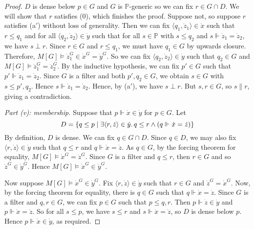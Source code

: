 \begin{proof}
    \( D \) is dense below \( p \in G \) and \( G \) is \( \mathbb P \)-generic so we can fix \( r \in G \cap D \).
    We will show that \( r \) satisfies (0), which finishes the proof.
    Suppose not, so suppose \( r \) satisfies (a\( ' \)) without loss of generality.
    Then we can fix \( \langle q_1, \dot z_1 \rangle \in \dot x \) such that \( r \leq q_1 \) and for all \( \langle q_2, \dot z_2 \rangle \in \dot y \) such that for all \( s \in \mathbb P \) with \( s \leq q_2 \) and \( s \Vdash \dot z_1 = \dot z_2 \), we have \( s \perp r \).
    Since \( r \in G \) and \( r \leq q_1 \), we must have \( q_1 \in G \) by upwards closure.
    Therefore, \( M[G] \vDash \dot z_1^G \in \dot x^G = \dot y^G \).
    So we can fix \( \langle q_2, \dot z_2 \rangle \in \dot y \) such that \( q_2 \in G \) and \( M[G] \vDash \dot z_1^G = \dot z_2^G \).
    By the inductive hypothesis, we can fix \( p' \in G \) such that \( p' \Vdash \dot z_1 = \dot z_2 \).
    Since \( G \) is a filter and both \( p', q_2 \in G \), we obtain \( s \in G \) with \( s \leq p', q_2 \).
    Hence \( s \Vdash \dot z_1 = \dot z_2 \).
    Hence, by (a\( ' \)), we have \( s \perp r \).
    But \( s, r \in G \), so \( s \mathrel\| r \), giving a contradiction.

    \emph{Part (v): membership.}
    Suppose that \( p \Vdash \dot x \in \dot y \) for \( p \in G \).
    Let
    \[ D = \qty{q \leq p \mid \exists \langle r, \dot z \rangle \in \dot y.\, q \leq r \wedge (q \Vdash \dot x = \dot z)} \]
    By definition, \( D \) is dense.
    We can fix \( q \in G \cap D \).
    Since \( q \in D \), we may also fix \( \langle r, \dot z \rangle \in \dot y \) such that \( q \leq r \) and \( q \Vdash \dot x = \dot z \).
    As \( q \in G \), by the forcing theorem for equality, \( M[G] \vDash \dot x^G = \dot z^G \).
    Since \( G \) is a filter and \( q \leq r \), then \( r \in G \) and so \( \dot z^G \in \dot y^G \).
    Hence \( M[G] \vDash \dot x^G \in \dot y^G \).

    Now suppose \( M[G] \vDash \dot x^G \in \dot y^G \).
    Fix \( \langle r, \dot z \rangle \in \dot y \) such that \( r \in G \) and \( \dot z^G = \dot x^G \).
    Now, by the forcing theorem for equality, there is \( q \in G \) such that \( q \Vdash \dot x = \dot z \).
    Since \( G \) is a filter and \( q, r \in G \), we can fix \( p \in G \) such that \( p \leq q, r \).
    Then \( p \Vdash \dot z \in \dot y \) and \( p \Vdash \dot x = \dot z \).
    So for all \( s \leq p \), we have \( s \leq r \) and \( s \Vdash \dot x = \dot z \), so \( D \) is dense below \( p \).
    Hence \( p \Vdash \dot x \in \dot y \), as required.
\end{proof}

